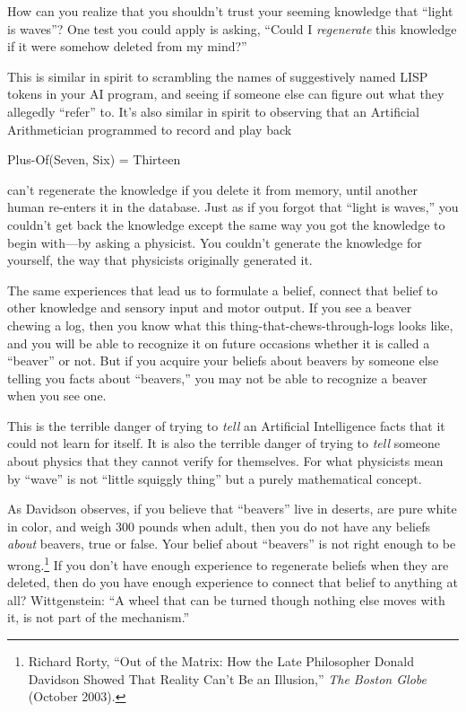 {
 How can you realize that you shouldn't trust your
seeming knowledge that ``light is
waves''? One test you could apply is asking,
``Could I \textit{regenerate} this knowledge if it
were somehow deleted from my mind?''}

{
 This is similar in spirit to scrambling the names of suggestively
named LISP tokens in your AI program, and seeing if someone else can
figure out what they allegedly
``refer'' to. It's
also similar in spirit to observing that an Artificial Arithmetician
programmed to record and play back}

{\centering
 Plus-Of(Seven, Six) = Thirteen
\par}


\bigskip

{
 can't regenerate the knowledge if you delete it
from memory, until another human re-enters it in the database. Just as
if you forgot that ``light is
waves,'' you couldn't get back the
knowledge except the same way you got the knowledge to begin with---by
asking a physicist. You couldn't generate the knowledge
for yourself, the way that physicists originally generated it. }

{
 The same experiences that lead us to formulate a belief, connect
that belief to other knowledge and sensory input and motor output. If
you see a beaver chewing a log, then you know what this
thing-that-chews-through-logs looks like, and you will be able to
recognize it on future occasions whether it is called a
``beaver'' or not. But if you
acquire your beliefs about beavers by someone else telling you facts
about ``beavers,'' you may not be
able to recognize a beaver when you see one.}

{
 This is the terrible danger of trying to \textit{tell} an
Artificial Intelligence facts that it could not learn for itself. It is
also the terrible danger of trying to \textit{tell} someone about
physics that they cannot verify for themselves. For what physicists
mean by ``wave'' is not
``little squiggly thing'' but a
purely mathematical concept.}

{
 As Davidson observes, if you believe that
``beavers'' live in deserts, are
pure white in color, and weigh 300 pounds when adult, then you do not
have any beliefs \textit{about} beavers, true or false. Your belief
about ``beavers'' is not right
enough to be wrong.\footnote{Richard Rorty, ``Out of the Matrix: How the
Late Philosopher Donald Davidson Showed That Reality
Can't Be an Illusion,'' \textit{The
Boston Globe} (October 2003).} If you don't
have enough experience to regenerate beliefs when they are deleted,
then do you have enough experience to connect that belief to anything
at all? Wittgenstein: ``A wheel that can be turned
though nothing else moves with it, is not part of the
mechanism.''}

